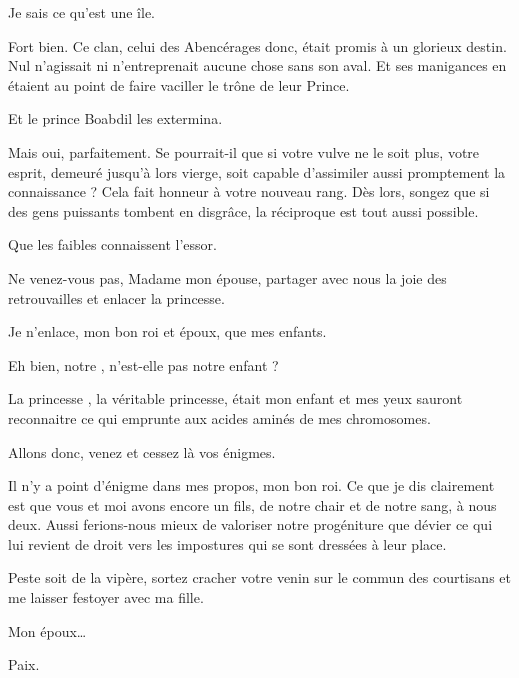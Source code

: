 \begin{drama}
  \elaspeaks {} Je sais ce qu’est une île.

  \elenaspeaks Fort bien.
  Ce clan, celui des Abencérages donc, était promis à un glorieux destin. Nul n’agissait ni n’entreprenait aucune chose sans son aval. Et ses manigances en étaient au point de faire vaciller le trône de leur Prince.

  \elaspeaks Et le prince Boabdil les extermina.

  \elenaspeaks Mais oui, parfaitement.  Se pourrait-il que si votre vulve ne le soit plus, votre esprit, demeuré jusqu’à lors vierge, soit capable d’assimiler aussi promptement la connaissance ? Cela  fait honneur à votre nouveau rang. Dès lors, songez que si des gens puissants tombent en disgrâce, la réciproque est tout aussi possible.


  \elaspeaks Que les faibles connaissent l’essor.

\end{drama}


\scene

\StageDirII{\roi, \reine, \ela}




\begin{drama}
  \roispeaks {} Ne venez-vous pas, Madame mon épouse, partager avec nous la joie des retrouvailles et enlacer la princesse.

  \reinespeaks Je n’enlace, mon bon roi et époux, que mes enfants.

  \roispeaks Eh bien, notre \princesse{}, n’est-elle pas notre enfant ?

  \reinespeaks La princesse \princesse{}, la véritable princesse, était mon enfant et mes yeux sauront reconnaitre ce qui emprunte aux acides aminés de mes chromosomes. %

  \roispeaks{} Allons donc, venez et cessez là vos énigmes.

  \reinespeaks Il n’y a point d’énigme dans mes propos, mon bon roi. Ce que je dis clairement est que vous et moi avons encore un fils, de notre chair et de notre sang, à nous deux. Aussi ferions-nous mieux de valoriser notre progéniture que dévier ce qui lui revient de droit vers les impostures qui se sont dressées à leur place.

  \roispeaks Peste soit de la vipère, sortez cracher votre venin sur le commun des courtisans et me laisser festoyer avec ma fille.

  \reinespeaks Mon époux…

  \roispeaks {} Paix.
\end{drama}



